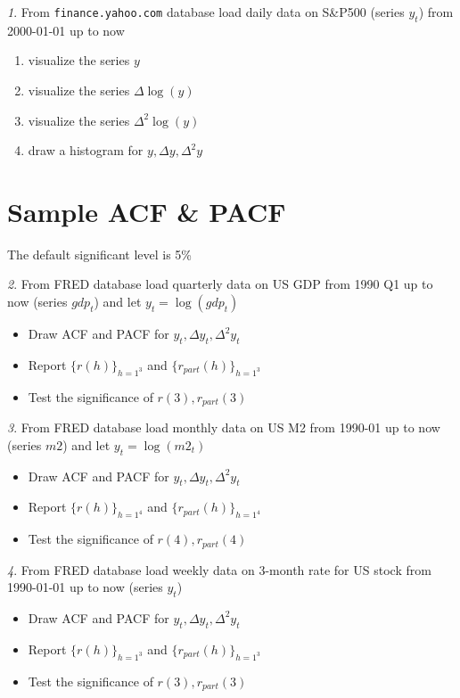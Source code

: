 \documentclass[12pt]{article}
\theoremstyle{remark}
\newtheorem{exercise}{}[section]
\begin{document}
\begin{exercise}
From \texttt{finance.yahoo.com} database load daily data on S\&P500 (series \(y_t\))
from 2000-01-01 up to now
\begin{enumerate}
	\item visualize the series \(y\) 
	\item visualize the series \(\Delta\log(y)\)
	\item visualize the series \(\Delta^2\log(y)\)
	\item draw a histogram for \(y,\Delta y,\Delta^2 y\)
\end{enumerate}
\end{exercise}

\section{Sample ACF \& PACF}

The default significant level is 5\%

\begin{exercise}
From FRED database load quarterly data on US GDP from 1990 Q1 up to now (series \(gdp_t\))
and let \(y_t=\log(gdp_t)\)
\begin{itemize}
		\item Draw ACF and PACF for \(y_t, \Delta y_t, \Delta^2 y_t\)
		\item Report \(\{r(h)\}_{h=1^3}\) and \(\{r_{part}(h)\}_{h=1^3}\) 
		\item Test the significance of \(r(3),r_{part}(3)\)
\end{itemize}
\end{exercise}

\begin{exercise}
From FRED database load monthly data on US M2 from 1990-01 up to now (series \(m2\)) 
and let \(y_t=\log(m2_t)\)
\begin{itemize}
	\item Draw ACF and PACF for \(y_t, \Delta y_t, \Delta^2 y_t\)
	\item Report \(\{r(h)\}_{h=1^4}\) and \(\{r_{part}(h)\}_{h=1^4}\) 
	\item Test the significance of \(r(4),r_{part}(4)\)
\end{itemize}
\end{exercise}

\begin{exercise}
From FRED database load weekly data on 3-month rate  for US stock from 1990-01-01 up to now
(series \(y_t\))
\begin{itemize}
	\item Draw ACF and PACF for \(y_t, \Delta y_t, \Delta^2 y_t\)
	\item Report \(\{r(h)\}_{h=1^3}\) and \(\{r_{part}(h)\}_{h=1^3}\) 
	\item Test the significance of \(r(3),r_{part}(3)\)
\end{itemize}
\end{exercise}
\end{document}
